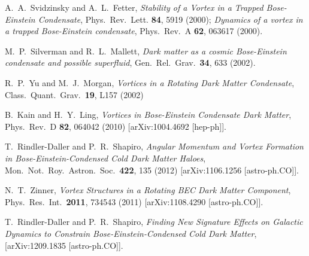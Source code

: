 \documentclass[aps,prd,twocolumn,nofootinbib,superscriptaddress]{revtex4-1}
\begin{document}
\begin{thebibliography}{99}

	A.~A.~Svidzinsky and A.~L.~Fetter,
	\emph{Stability of a Vortex in a Trapped Bose-Einstein Condensate},
	Phys.\ Rev.\ Lett. {\bf 84}, 5919 (2000);
	\emph{Dynamics of a vortex in a trapped Bose-Einstein condensate},
	Phys.\ Rev.\ A {\bf 62}, 063617 (2000).

  M.~P.~Silverman and R.~L.~Mallett,
  \emph{Dark matter as a cosmic Bose-Einstein condensate and possible superfluid},
  Gen.\ Rel.\ Grav.\  {\bf 34}, 633 (2002).
  
  R.~P.~Yu and M.~J.~Morgan,
  \emph{Vortices in a Rotating Dark Matter Condensate},
  Class.\ Quant.\ Grav.\ {\bf 19}, L157 (2002)
  
  B.~Kain and H.~Y.~Ling,
  \emph{Vortices in Bose-Einstein Condensate Dark Matter},
  Phys.\ Rev.\ D {\bf 82}, 064042 (2010)
  [arXiv:1004.4692 [hep-ph]].
  
  T.~Rindler-Daller and P.~R.~Shapiro,
  \emph{Angular Momentum and Vortex Formation in Bose-Einstein-Condensed Cold Dark Matter Haloes},
  Mon.\ Not.\ Roy.\ Astron.\ Soc.\  {\bf 422}, 135 (2012)
  [arXiv:1106.1256 [astro-ph.CO]].

  N.~T.~Zinner,
  \emph{Vortex Structures in a Rotating BEC Dark Matter Component},
  Phys.\ Res.\ Int.\  {\bf 2011}, 734543 (2011)
  [arXiv:1108.4290 [astro-ph.CO]].

  T.~Rindler-Daller and P.~R.~Shapiro,
  \emph{Finding New Signature Effects on Galactic Dynamics to Constrain Bose-Einstein-Condensed Cold Dark Matter},
  [arXiv:1209.1835 [astro-ph.CO]].


\end{thebibliography}
\end{document}
